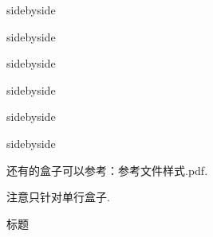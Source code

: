 \documentclass[a4]{ctexart}
\begin{document}
\begin{tcblisting}{sidebyside}
    
\end{tcblisting}

\begin{tcblisting}{sidebyside}
    
\end{tcblisting}


\begin{tcblisting}{sidebyside}
    
\end{tcblisting}

\begin{tcblisting}{sidebyside}
    
\end{tcblisting}

\begin{tcblisting}{sidebyside}
    
\end{tcblisting}

\begin{tcblisting}{sidebyside}
    
\end{tcblisting}

还有的盒子可以参考：参考文件样式.pdf.
\begin{marker}
    注意只针对单行盒子.
\end{marker}

\begin{breakablebox}[子标题]{标题}
    \zhlipsum[1-5]{}
\end{breakablebox}
\end{document}
